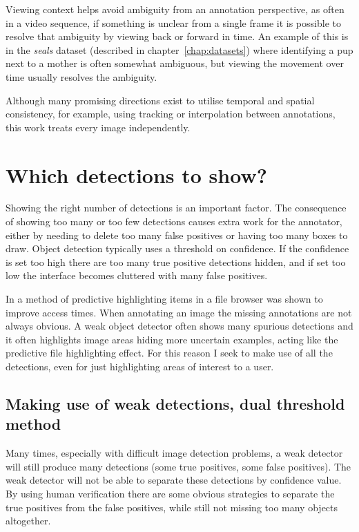Viewing context helps avoid ambiguity from an annotation perspective, as often in a video sequence, if something is unclear from a single frame it is possible to resolve that ambiguity by viewing back or forward in time. An example of this is in the \emph{seals} dataset (described in chapter~\ref{chap:datasets}) where identifying a pup next to a mother is often somewhat ambiguous, but viewing the movement over time usually resolves the ambiguity.

Although many promising directions exist to utilise temporal and spatial consistency, for example, using tracking or interpolation between annotations, this work treats every image independently. 


\section {Which detections to show?}
\label{sec:thresholding}

Showing the right number of detections is an important factor. The consequence of showing too many or too few detections causes extra work for the annotator, either by needing to delete too many false positives or having too many boxes to draw. Object detection typically uses a threshold on confidence. If the confidence is set too high there are too many true positive detections hidden, and if set too low the interface becomes cluttered with many false positives.

In \cite{Fitchett2013} a method of predictive highlighting items in a file browser was shown to improve access times. When annotating an image the missing annotations are not always obvious. A weak object detector often shows many spurious detections and it often highlights image areas hiding more uncertain examples, acting like the predictive file highlighting effect. For this reason I seek to make use of all the detections, even for just highlighting areas of interest to a user. 

\subsection{Making use of weak detections, dual threshold method}

 Many times, especially with difficult image detection problems, a weak detector will still produce many detections (some true positives, some false positives). The weak detector will not be able to separate these detections by confidence value. By using human verification there are some obvious strategies to separate the true positives from the false positives, while still not missing too many objects altogether. 

